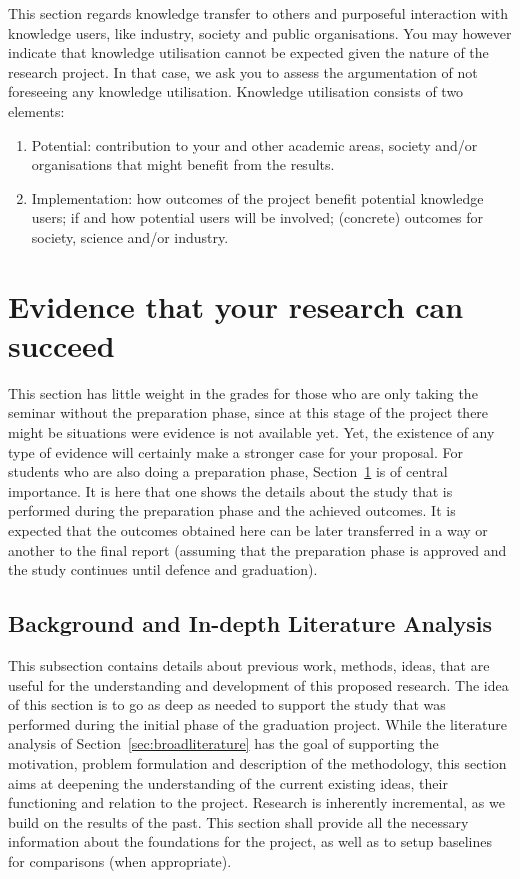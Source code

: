 \documentclass{article}
\begin{document}
This section regards knowledge transfer to others and purposeful interaction with knowledge users, like industry, society and public organisations. You may however indicate that knowledge utilisation cannot be expected given the nature of the research project. In that case, we ask you to assess the argumentation of not foreseeing any knowledge utilisation. Knowledge utilisation consists of two elements:

\begin{enumerate}
  \item Potential: contribution to your and other academic areas, society and/or organisations that might benefit from the results.

  \item Implementation: how outcomes of the project benefit potential knowledge users; if and how potential users will be involved; (concrete) outcomes for society, science and/or industry.
\end{enumerate}


\section{Evidence that your research can succeed}\label{sec:evidence}

This section has little weight in the grades for those who are only taking the seminar without the preparation phase, since at this stage of the project there might be situations were evidence is not available yet. Yet, the existence of any type of evidence will certainly make a stronger case for your proposal. For students who are also doing a preparation phase, Section~\ref{sec:evidence} is of central importance. It is here that one shows the details about the study that is performed during the preparation phase and the achieved outcomes. It is expected that the outcomes obtained here can be later transferred in a way or another to the final report (assuming that the preparation phase is approved and the study continues until defence and graduation).

\subsection{Background and In-depth Literature Analysis}\label{sec:background}

This subsection contains details about previous work, methods, ideas, that are useful for the understanding and development of this proposed research. The idea of this section is to go as deep as needed to support the study that was performed during the initial phase of the graduation project. While the literature analysis of Section~\ref{sec:broadliterature} has the goal of supporting the motivation, problem formulation and description of the methodology, this section aims at deepening the understanding of the current existing ideas, their functioning and relation to the project. Research is inherently incremental, as we build on the results of the past. This section shall provide all the necessary information about the foundations for the project, as well as to setup baselines for comparisons (when appropriate).
\end{document}
